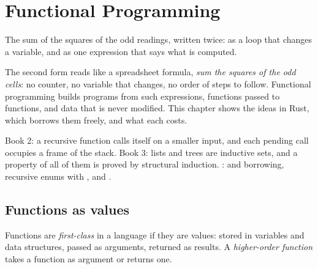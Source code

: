 \chapter{Functional Programming}\label{ch:b2:functional-programming}

The sum of the squares of the odd readings, written twice: as a loop that changes a variable, and as one expression
that says what is computed.

\label{lst:b2:functional-programming:odd}


The second form reads like a spreadsheet formula, \emph{sum the squares of the odd cells}: no counter, no variable
that changes, no order of steps to follow. Functional programming builds programs from such expressions, functions
passed to functions, and data that is never modified. This chapter shows the ideas in Rust, which borrows them
freely, and what each costs.

\begin{recall}
Book 2: a recursive function calls itself on a smaller input, and each pending call occupies a frame of the stack.
Book 3: lists and trees are inductive sets, and a property of all of them is proved by structural induction.
:  and borrowing,
recursive enums with ,  and .
\end{recall}

\section{Functions as values}\label{sec:b2:functional-programming:closures}

\begin{definition}\label{def:b2:functional-programming:higher-order}
Functions are \emph{first-class} in a language if they are values: stored in variables
and data structures, passed as arguments, returned as results. A \emph{higher-order function} takes a function as argument or returns one.
\end{definition}

